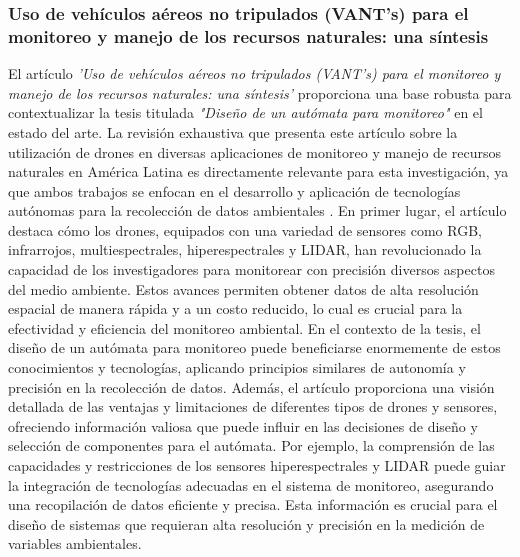 \subsubsection{Uso de veh\'iculos a\'ereos  no tripulados (VANT's) para el monitoreo y manejo de los recursos naturales: una s\'intesis} %
\label{ssub:subsubsection name}
    El art\'iculo \textit{'Uso de veh\'iculos a\'ereos no tripulados (VANT's) para el monitoreo y manejo de los recursos naturales: una s\'intesis'} 
        proporciona una base robusta para contextualizar la tesis titulada \textit{"Dise\~no de un aut\'omata para monitoreo"} en 
        el estado del arte. La revisi\'on exhaustiva que presenta este art\'iculo sobre la utilizaci\'on de drones en diversas aplicaciones 
        de monitoreo y manejo de recursos naturales en Am\'erica Latina es directamente relevante para esta investigaci\'on, 
        ya que ambos trabajos se enfocan en el desarrollo y aplicaci\'on de tecnolog\'ias aut\'onomas para la recolecci\'on 
        de datos ambientales \cite{Guevara2020}.
    \vskip 0.5cm
    En primer lugar, el art\'iculo destaca c\'omo los drones, equipados con una variedad de sensores como RGB, infrarrojos, 
        multiespectrales, hiperespectrales y LIDAR, han revolucionado la capacidad de los investigadores para monitorear 
        con precisi\'on diversos aspectos del medio ambiente. Estos avances permiten obtener datos de alta resoluci\'on espacial 
        de manera r\'apida y a un costo reducido, lo cual es crucial para la efectividad y eficiencia del monitoreo ambiental. 
        En el contexto de la tesis, el dise\~no de un aut\'omata para monitoreo puede beneficiarse enormemente de estos conocimientos 
        y tecnolog\'ias, aplicando principios similares de autonom\'ia y precisi\'on en la recolecci\'on de datos.
    \vskip 0.5cm
    Adem\'as, el art\'iculo proporciona una visi\'on detallada de las ventajas y limitaciones de diferentes tipos de drones y sensores, 
        ofreciendo informaci\'on valiosa que puede influir en las decisiones de dise\~no y selecci\'on de componentes para el aut\'omata. 
        Por ejemplo, la comprensi\'on de las capacidades y restricciones de los sensores hiperespectrales y LIDAR puede guiar 
        la integraci\'on de tecnolog\'ias adecuadas en el sistema de monitoreo, asegurando una recopilaci\'on de datos eficiente y 
        precisa. Esta informaci\'on es crucial para el dise\~no de sistemas que requieran alta resoluci\'on y precisi\'on en la medici\'on 
        de variables ambientales.
